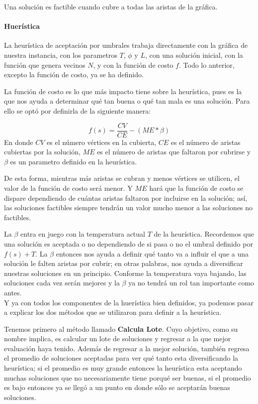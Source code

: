 \documentclass{article}
\newcommand{\tbf}[1]{\textbf{#1}}
\begin{document}
  Una solución es factible cuando cubre a todas las aristas de la gráfica.

  \paragraph{Huerística}

  La heurística de aceptación por umbrales trabaja directamente con 
  la gráfica de nuestra instancia, con los parametros $T$, $\phi$ y $L$,
  con una solución inicial, con la función que genera vecinos $N$, y 
  con la función de costo $f$. Todo lo anterior, excepto la función de 
  costo, ya se ha definido.

  La función de costo es lo que más impacto tiene sobre la heurística, 
  pues es la que nos ayuda a determinar qué tan buena o qué tan mala 
  es una solución. Para ello se optó por definirla de la siguiente 
  manera:

  \begin{equation}
    f(s) = \frac{CV}{CE} - (ME * \beta)
  \end{equation}
  En donde $CV$ es el número vértices en la cubierta, $CE$ es el 
  número de aristas cubiertas por la solución, $ME$ es el número 
  de aristas que faltaron por cubrirse y $\beta$ es un parametro
  definido en la heurística.

  De esta forma, mientras más aristas se cubran y menos vértices 
  se utilicen, el valor de la función de costo será menor. Y 
  $ME$ hará que la función de costo se dispare dependiendo de 
  cuántas aristas faltaron por incluirse en la solución; así,
  las soluciones factibles siempre tendrán un valor mucho 
  menor a las soluciones no factibles.

  La $\beta$ entra en juego con la temperatura actual $T$ de la 
  heurística. Recordemos que una solución es aceptada o no 
  dependiendo de si pasa o no el umbral definido por $f(s) + T$.
  La $\beta$ entonces nos ayuda a definir qué tanto va a influir 
  el que a una solución le falten aristas por cubrir; en otras
  palabras, nos ayuda a diversificar nuestras soluciones en un 
  principio. Conforme la temperatura vaya bajando, las soluciones
  cada vez serán mejores y la $\beta$ ya no tendrá un rol 
  tan importante como antes. \\

  Y ya con todos los componentes de la huerística bien definidos,
  ya podemos pasar a explicar los dos métodos que se utilizaron
  para definir a la heurística.

  Tenemos primero al método llamado \tbf{Calcula Lote}. Cuyo 
  objetivo, como su nombre implica, es calcular un lote de 
  soluciones y regresar a la que mejor evaluación haya tenido.
  Además de regresar a la mejor solución, también regresa 
  el promedio de soluciones aceptadas para ver qué tanto
  esta diversificando la heurística; si el promedio es muy 
  grande entonces la heurística esta aceptando muchas soluciones
  que no necesariamente tiene porqué ser buenas, si el promedio 
  es bajo entonces ya se llegó a un punto en donde sólo 
  se aceptarán buenas soluciones.
\end{document}
